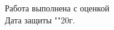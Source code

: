 \documentclass[a4paper, 12pt]{article}
\begin{document}
\begin{titlepage}
  	\vfill
  
  	\flushleft \fontsize{14pt}{2pt}\selectfont
  	
	Работа выполнена с оценкой \hspace{1cm} \underline{\hspace{8cm}} \\ 
    \vspace{1cm}
    Дата защиты "\underline{\hspace{0.7cm}}"\hspace{0.2cm}\underline{\hspace{2cm}}\hspace{0.2cm}20\underline{\hspace{0.7cm}}г.
\end{titlepage}
\end{document}
